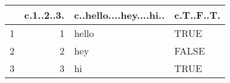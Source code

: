 \begin{table}[ht]
\centering
\begin{tabular}{rrll}
  \hline
 & c.1..2..3. & c..hello....hey....hi.. & c.T..F..T. \\ 
  \hline
1 &   1 & hello & TRUE \\ 
  2 &   2 & hey & FALSE \\ 
  3 &   3 & hi & TRUE \\ 
   \hline
\end{tabular}
\end{table}
